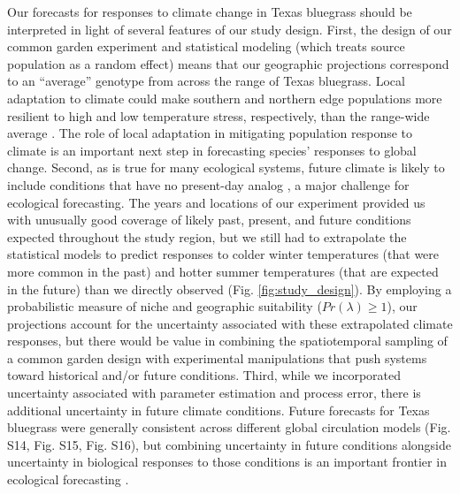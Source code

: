 \documentclass[9pt,twocolumn,twoside,lineno]{pnas-new}
\begin{document}
Our forecasts for responses to climate change in Texas bluegrass should be interpreted in light of several features of our study design. 
First, the design of our common garden experiment and statistical modeling (which treats source population as a random effect) means that our geographic projections correspond to an ``average'' genotype from across the range of Texas bluegrass. 
Local adaptation to climate could make southern and northern edge populations more resilient to high and low temperature stress, respectively, than the range-wide average \citep{angert2020we}. 
The role of local adaptation in mitigating population response to climate is an important next step in forecasting species' responses to global change.
Second, as is true for many ecological systems, future climate is likely to include conditions that have no present-day analog \citep{intergovernmental_panel_on_climate_change_ipcc_climate_2023}, a major challenge for ecological forecasting. 
The years and locations of our experiment provided us with unusually good coverage of likely past, present, and future conditions expected throughout the study region, but we still had to extrapolate the statistical models to predict responses to colder winter temperatures (that were more common in the past) and hotter summer temperatures (that are expected in the future) than we directly observed (Fig. \ref{fig:study_design}). 
By employing a probabilistic measure of niche and geographic suitability ($Pr(\lambda)\ge1$), our projections account for the uncertainty associated with these extrapolated climate responses, but there would be value in combining the spatiotemporal sampling of a common garden design with experimental manipulations that push systems toward historical and/or future conditions. 
Third, while we incorporated uncertainty associated with parameter estimation and process error, there is additional uncertainty in future climate conditions. 
Future forecasts for Texas bluegrass were generally consistent across different global circulation models (Fig. S14, Fig. S15, Fig. S16), but combining uncertainty in future conditions alongside uncertainty in biological responses to those conditions is an important frontier in ecological forecasting \citep{dietze2018iterative}. 
\end{document}
